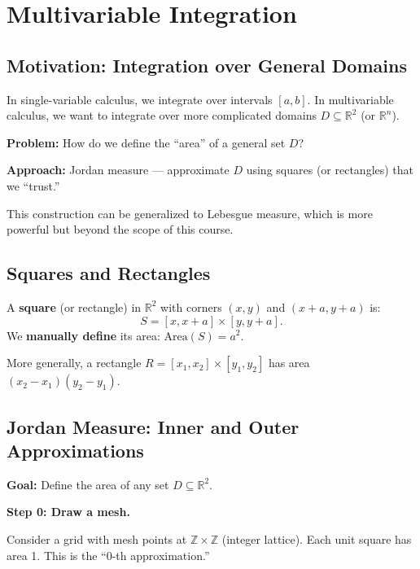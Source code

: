 \documentclass[11pt]{report}
\newcommand{\R}{\mathbb{R}}
\newcommand{\Z}{\mathbb{Z}}
\begin{document}
\section{Multivariable Integration}

\subsection*{Motivation: Integration over General Domains}

In single-variable calculus, we integrate over intervals $[a, b]$. In multivariable calculus, we want to integrate over more complicated domains $D \subseteq \R^2$ (or $\R^n$).

\textbf{Problem:} How do we define the ``area'' of a general set $D$?

\textbf{Approach:} Jordan measure --- approximate $D$ using squares (or rectangles) that we ``trust.''

\begin{remark}
This construction can be generalized to Lebesgue measure, which is more powerful but beyond the scope of this course.
\end{remark}

\subsection*{Squares and Rectangles}

\begin{definition}
A \textbf{square} (or rectangle) in $\R^2$ with corners $(x, y)$ and $(x + a, y + a)$ is:
\[
S = [x, x + a] \times [y, y + a].
\]
We \textbf{manually define} its area: $\text{Area}(S) = a^2$.

More generally, a rectangle $R = [x_1, x_2] \times [y_1, y_2]$ has area $(x_2 - x_1)(y_2 - y_1)$.
\end{definition}

\subsection{Jordan Measure: Inner and Outer Approximations}

\textbf{Goal:} Define the area of any set $D \subseteq \R^2$.

\textbf{Step 0: Draw a mesh.}

Consider a grid with mesh points at $\Z \times \Z$ (integer lattice). Each unit square has area 1. This is the ``0-th approximation.''
\end{document}
